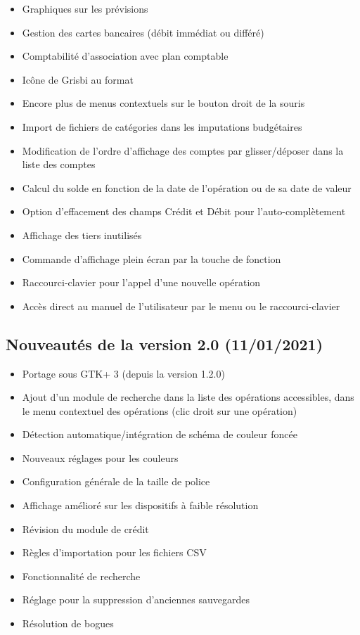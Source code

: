 \begin{itemize}
	\item Graphiques sur les prévisions
	\item Gestion des cartes bancaires (débit immédiat ou différé)
	\item Comptabilité d'association avec plan comptable
	\item Icône de Grisbi au format 
	\item Encore plus de menus contextuels sur le bouton droit de la souris
	\item Import de fichiers de catégories dans les imputations budgétaires
	\item Modification de l'ordre d'affichage des comptes par glisser/déposer dans la liste des comptes
	\item Calcul du solde en fonction de la date de l'opération ou de sa date de valeur
	\item Option d'effacement des champs Crédit et Débit pour l'auto-complètement
	\item Affichage des tiers inutilisés	
	\item Commande d'affichage plein écran par la touche de fonction 
	\item Raccourci-clavier  pour l'appel d'une nouvelle opération
	\item Accès direct au manuel de l'utilisateur par le menu  ou le raccourci-clavier 
\end{itemize}


\subsection{Nouveautés de la version 2.0 \textnormal{(11/01/2021)}}

\begin{itemize}
	\item Portage sous \gls{GTK}+ 3 (depuis la version 1.2.0)
	\item Ajout d'un module de recherche dans la liste des opérations accessibles, dans le menu contextuel des opérations (clic droit sur une opération)
	\item Détection automatique/intégration de schéma de couleur foncée
	\item Nouveaux réglages pour les couleurs
	\item Configuration générale de la taille de police
	\item Affichage amélioré sur les dispositifs à faible résolution
	\item Révision du module de crédit
	\item Règles d'importation pour les fichiers \gls{CSV}
	\item Fonctionnalité de recherche
	\item Réglage pour la suppression d'anciennes sauvegardes
	\item Résolution de bogues
\end{itemize}


